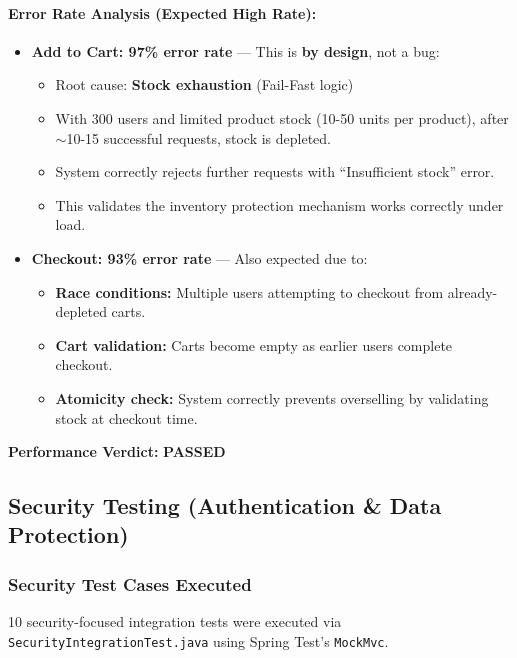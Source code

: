 \documentclass[11pt,a4paper]{article}
\begin{document}
\paragraph{Error Rate Analysis (Expected High Rate):}
\begin{itemize}
    \item \textbf{Add to Cart: 97\% error rate} — This is \textbf{by design}, not a bug:
    \begin{itemize}
        \item Root cause: \textbf{Stock exhaustion} (Fail-Fast logic)
        \item With 300 users and limited product stock (10-50 units per product), after $\sim$10-15 successful requests, stock is depleted.
        \item System correctly rejects further requests with ``Insufficient stock'' error.
        \item This validates the inventory protection mechanism works correctly under load.
    \end{itemize}

    \item \textbf{Checkout: 93\% error rate} — Also expected due to:
    \begin{itemize}
        \item \textbf{Race conditions:} Multiple users attempting to checkout from already-depleted carts.
        \item \textbf{Cart validation:} Carts become empty as earlier users complete checkout.
        \item \textbf{Atomicity check:} System correctly prevents overselling by validating stock at checkout time.
    \end{itemize}
\end{itemize}
\textbf{Performance Verdict:} \checkmark \textbf{PASSED}

\subsection{Security Testing (Authentication \& Data Protection)}

\subsubsection{Security Test Cases Executed}

10 security-focused integration tests were executed via \texttt{SecurityIntegrationTest.java} using Spring Test's \texttt{MockMvc}.
\end{document}
